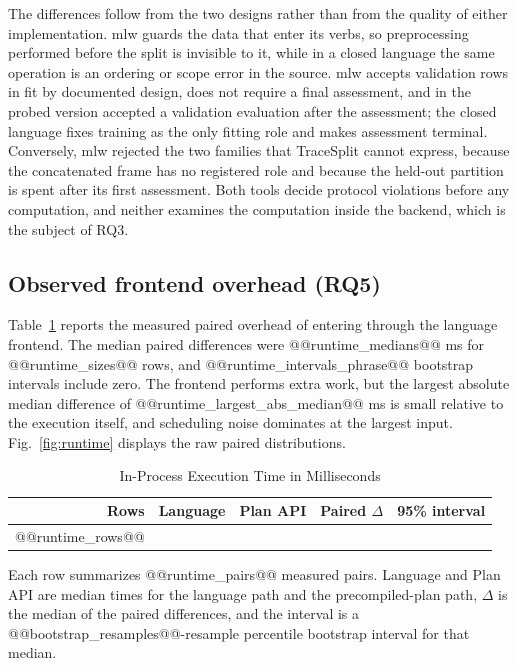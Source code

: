 \documentclass[lettersize,journal]{IEEEtran}
\newcommand{\tool}{TraceSplit}
\begin{document}
The differences follow from the two designs rather than from the quality of either implementation. mlw guards the data that enter its verbs, so preprocessing performed before the split is invisible to it, while in a closed language the same operation is an ordering or scope error in the source. mlw accepts validation rows in fit by documented design, does not require a final assessment, and in the probed version accepted a validation evaluation after the assessment; the closed language fixes training as the only fitting role and makes assessment terminal. Conversely, mlw rejected the two families that \tool{} cannot express, because the concatenated frame has no registered role and because the held-out partition is spent after its first assessment. Both tools decide protocol violations before any computation, and neither examines the computation inside the backend, which is the subject of RQ3.

\subsection{Observed frontend overhead (RQ5)}
Table~\ref{tab:runtime} reports the measured paired overhead of entering through the language frontend. The median paired differences were @@runtime_medians@@ ms for @@runtime_sizes@@ rows, and @@runtime_intervals_phrase@@ bootstrap intervals include zero. The frontend performs extra work, but the largest absolute median difference of @@runtime_largest_abs_median@@ ms is small relative to the execution itself, and scheduling noise dominates at the largest input. Fig.~\ref{fig:runtime} displays the raw paired distributions.

\begin{table}[t]
\caption{In-Process Execution Time in Milliseconds}
\label{tab:runtime}\centering\footnotesize
\begin{tabular}{rrrrl}\toprule
Rows & Language & Plan API & Paired $\Delta$ & 95\% interval\\\midrule
@@runtime_rows@@
\bottomrule
\end{tabular}

\smallskip
\parbox{0.95\columnwidth}{\footnotesize Each row summarizes @@runtime_pairs@@ measured pairs. Language and Plan API are median times for the language path and the precompiled-plan path, $\Delta$ is the median of the paired differences, and the interval is a @@bootstrap_resamples@@-resample percentile bootstrap interval for that median.}
\end{table}
\end{document}
